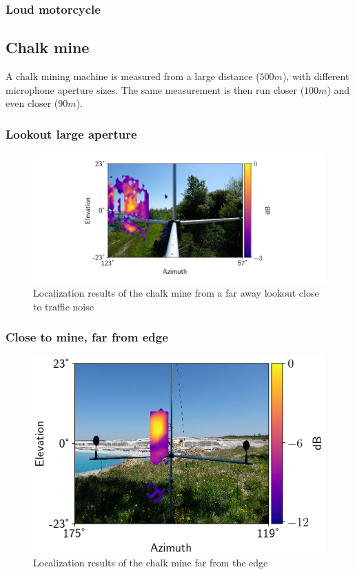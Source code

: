 \subsubsection{Loud motorcycle}

\subsection{Chalk mine}
A chalk mining machine is measured from a large distance ($500m$), with different microphone aperture sizes. The same measurement is then run closer ($100m$) and even closer ($90m$).
\subsubsection{Lookout large aperture}
\begin{figure}[H]
    \centering
    \includegraphics[width=1\textwidth]{Figures/ChalkFarFar.png}
    \caption{Localization results of the chalk mine from a far away lookout close to traffic noise}
    \label{fig:ChalkCLose}
\end{figure}


\subsubsection{Close to mine, far from edge}
\begin{figure}[H]
    \centering
    \includegraphics[width=1\textwidth]{Figures/ChalkFar.png}
    \caption{Localization results of the chalk mine far from the edge}
    \label{fig:ChalkCLose}
\end{figure}

